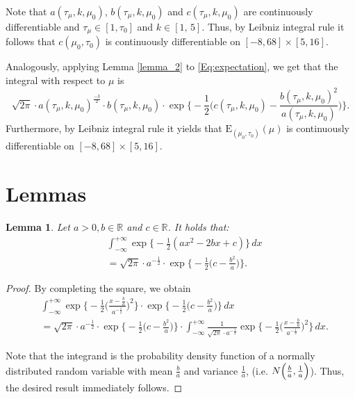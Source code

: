 \documentclass{amsart}
\theoremstyle{plain}%
\newtheorem{lemma}[theorem]{Lemma}
\begin{document}
Note that $a(\tau_\mu, k, \mu_0)$, $b(\tau_\mu, k, \mu_0)$ and $c(\tau_\mu, k, \mu_0)$ are continuously differentiable and  $\tau_\mu \in [1, \tau_0]$ and $k \in [1,\, 5]$. 
Thus, by Leibniz integral rule it follows that
$c(\mu_0,\tau_0)$ is continuously differentiable on $[-8,68] \times [5,16]$. 

Analogously, applying Lemma \ref{lemma_2} 
to \cref{Eq:expectation}, we get that the integral with respect to $\mu$ is 
\begin{equation}
\sqrt{2\pi}\cdot a(\tau_\mu, k, \mu_0)^{\frac{-3}{2}} \cdot b(\tau_\mu, k, \mu_0) \cdot \exp \Biggl\{-\frac{1}{2} \Biggl (c(\tau_\mu, k, \mu_0) - \frac{b(\tau_\mu, k, \mu_0)^2}{a(\tau_\mu, k, \mu_0)} \Biggr) \Biggr\}.
\end{equation}
Furthermore, by Leibniz integral rule it yields that
$\mathrm{E}_{(\mu_0, \tau_0)}(\mu)$ is continuously differentiable on $[-8,68] \times [5,16]$.  

\section {Lemmas} 

\begin{lemma} \label{lemma_1}
Let $a > 0, b \in \mathbb{R}$ and $c \in \mathbb{R}$. It holds  that:
\begin{align}
	& \int_{-\infty}^{+\infty} \exp \Biggl\{-\frac{1}{2}(ax^2 -2bx + c)\Biggr\} \,dx  \\
	& = \sqrt{2\pi} \cdot a^{-\frac{1}{2}} \cdot \exp \Biggl \{  -\frac{1}{2} \Biggl(c - \frac{b^2}{a} \Biggr) \Biggr \}.
\end{align}
\end{lemma}


\begin{proof}
	By completing the square, we obtain 
	\begin{align}
		& \int_{-\infty}^{+\infty} \exp \Biggl\{-\frac{1}{2}\Biggl(\frac{x - \frac{b}{a}} {a^{-\frac{1}{2}}}\Biggr) ^2 \Biggr\}
		\cdot \exp \Biggl\{-\frac{1}{2}\Biggl(c - \frac{b^2}{a}\Biggr) \Biggr \}  \,dx \\ 
		& = \sqrt{2 \pi} \cdot a^{-\frac{1}{2}} \cdot \exp \Biggl\{-\frac{1}{2} \Biggl(c - \frac{b^2}{a}\Biggr)\Biggr\} \cdot 
		\int_{-\infty}^{+\infty} \frac{1}{\sqrt{2 \pi} \cdot a^{-\frac{1}{2}}}
		\exp \Biggl\{-\frac{1}{2} \Biggl(\frac{x - \frac{b}{a}} {a^{-\frac{1}{2}}}\Biggr) ^2 \Biggr\} \,dx.
	\end{align}

Note that the integrand is the probability density function of a normally distributed 
random variable with mean $\frac{b}{a}$ and variance $\frac{1}{a}$, (i.e. $N \Bigl (\frac{b}{a}, \frac{1}{a}\Bigr)$). 
Thus, the desired result immediately follows.
\end{proof}
\end{document}
